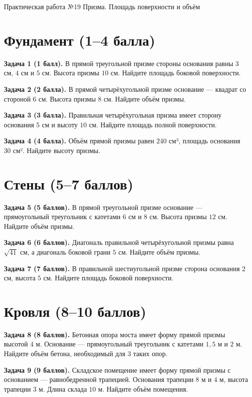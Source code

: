\documentclass{umk-matematika}
\begin{document}
\maketitlepage
    {Практическая работа №19}
    {Призма. Площадь поверхности и объём}
    {}

\section{Фундамент (1--4 балла)}

\textbf{Задача 1 (1 балл).} В прямой треугольной призме стороны основания равны $3$ см, $4$ см и $5$ см. Высота призмы $10$ см. Найдите площадь боковой поверхности.

\textbf{Задача 2 (2 балла).} В прямой четырёхугольной призме основание — квадрат со стороной $6$ см. Высота призмы $8$ см. Найдите объём призмы.

\textbf{Задача 3 (3 балла).} Правильная четырёхугольная призма имеет сторону основания $5$ см и высоту $10$ см. Найдите площадь полной поверхности.

\textbf{Задача 4 (4 балла).} Объём прямой призмы равен $240$ см³, площадь основания $30$ см². Найдите высоту призмы.

\section{Стены (5--7 баллов)}

\textbf{Задача 5 (5 баллов).} В прямой треугольной призме основание — прямоугольный треугольник с катетами $6$ см и $8$ см. Высота призмы $12$ см. Найдите объём призмы.

\textbf{Задача 6 (6 баллов).} Диагональ правильной четырёхугольной призмы равна $\sqrt{41}$ см, а диагональ боковой грани $5$ см. Найдите объём призмы.

\textbf{Задача 7 (7 баллов).} В правильной шестиугольной призме сторона основания $2$ см, высота $5$ см. Найдите площадь боковой поверхности.

\section{Кровля (8--10 баллов)}

\textbf{Задача 8 (8 баллов).} Бетонная опора моста имеет форму прямой призмы высотой $4$ м. Основание — прямоугольный треугольник с катетами $1{,}5$ м и $2$ м. Найдите объём бетона, необходимый для $3$ таких опор.

\textbf{Задача 9 (9 баллов).} Складское помещение имеет форму прямой призмы с основанием — равнобедренной трапецией. Основания трапеции $8$ м и $4$ м, высота трапеции $3$ м. Длина склада $10$ м. Найдите объём помещения.
\end{document}

